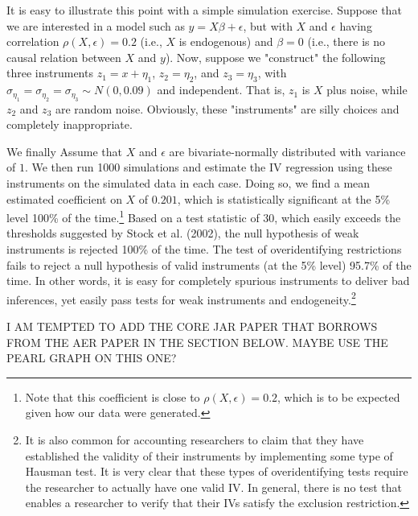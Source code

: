 \documentclass[11pt]{amsart}
\begin{document}
It is easy to illustrate this point with a simple simulation exercise.
Suppose that we are interested in a model such as $y = X \beta + \epsilon$, but with $X$ and $\epsilon$ having correlation $\rho(X, \epsilon) = 0.2$ (i.e., $X$ is endogenous) and $\beta = 0$ (i.e., there is no causal relation between $X$ and $y$). 
Now, suppose we "construct" the following three instruments 
$z_1 = x +\eta_1$, $z_2 = \eta_2$, and $z_3 = \eta_3$, with $\sigma_{\eta_1} = \sigma_{\eta_2} = \sigma_{\eta_3} \sim N(0, 0.09)$ and independent. 
That is, $z_1$ is $X$ plus noise, while $z_2$ and $z_3$ are random noise.  Obviously, these "instruments" are silly choices and completely inappropriate.

We finally  Assume that $X$ and $\epsilon$ are bivariate-normally distributed with variance of $1$. We then run 1000 simulations and  estimate the IV regression using these instruments on the simulated data in each case. Doing so, we find a mean estimated coefficient on $X$ of $0.201$, which is statistically significant at the 5\% level 100\% of the time.\footnote{Note that this coefficient is close to $\rho(X, \epsilon) = 0.2$, which is to be expected given how our data were generated.} Based on a test statistic of 30, which easily exceeds the thresholds suggested by Stock et al. (2002), the null hypothesis of weak instruments is rejected 100\% of the time. 
The test of overidentifying restrictions fails to reject a null hypothesis of valid instruments (at the 5\% level) 95.7\% of the time.
In other words, it is easy for completely spurious instruments to deliver bad inferences, yet easily pass tests for weak instruments and endogeneity.\footnote{It is also common for accounting researchers to claim that they have established the validity of their instruments by implementing some type of Hausman test.  It is very clear that these types of overidentifying tests require the researcher to actually have one valid IV.  In general, there is no test that enables a researcher to verify that their IVs satisfy the exclusion restriction.}


I AM TEMPTED TO ADD THE CORE JAR PAPER THAT BORROWS FROM THE AER PAPER IN THE SECTION BELOW.  MAYBE USE THE PEARL GRAPH ON THIS ONE?
\end{document}
